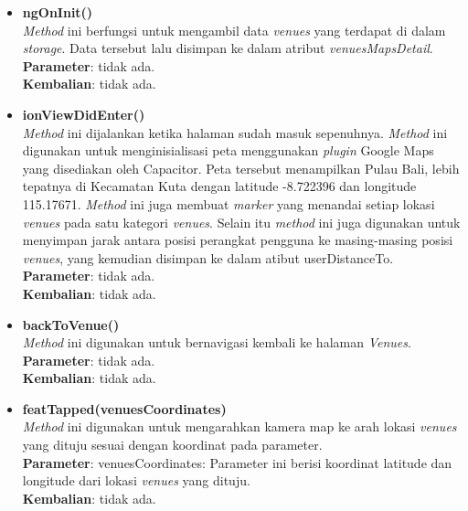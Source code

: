 \begin{enumerate}
\begin{itemize}
					\item \textbf{ngOnInit()}\\ 
					\textit{Method} ini berfungsi untuk mengambil data \textit{venues} yang terdapat di dalam \textit{storage}. Data tersebut lalu disimpan ke dalam atribut \textit{venuesMapsDetail}. \\
					\textbf{Parameter}: tidak ada. \\
					\textbf{Kembalian}: tidak ada.
						
					\item \textbf{ionViewDidEnter()} \\
						\textit{Method} ini dijalankan ketika halaman sudah masuk sepenuhnya. \textit{Method} ini digunakan untuk menginisialisasi peta menggunakan \textit{plugin} Google Maps yang disediakan oleh Capacitor. Peta tersebut menampilkan Pulau Bali, lebih tepatnya di Kecamatan Kuta dengan latitude -8.722396 dan longitude 115.17671. \textit{Method} ini juga membuat \textit{marker} yang menandai setiap lokasi \textit{venues} pada satu kategori \textit{venues}. Selain itu \textit{method} ini juga digunakan untuk menyimpan jarak antara posisi perangkat pengguna ke masing-masing posisi \textit{venues}, yang kemudian disimpan ke dalam atibut userDistanceTo.\\
						\textbf{Parameter}: tidak ada. \\
						\textbf{Kembalian}: tidak ada.
						
					\item \textbf{backToVenue()} \\
						\textit{Method} ini digunakan untuk bernavigasi kembali ke halaman \textit{Venues}. \\
						\textbf{Parameter}: tidak ada. \\
						\textbf{Kembalian}: tidak ada.
						
					\item \textbf{featTapped(venuesCoordinates)} \\
						\textit{Method} ini digunakan untuk mengarahkan kamera map ke arah lokasi \textit{venues} yang dituju sesuai dengan koordinat pada parameter. \\
						\textbf{Parameter}: venuesCoordinates: Parameter ini berisi koordinat latitude dan longitude dari lokasi \textit{venues} yang dituju. \\
						\textbf{Kembalian}: tidak ada.
						

\end{itemize}
\end{enumerate}
